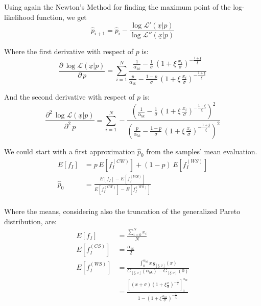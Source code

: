 Using again the Newton's Method for finding the maximum point of the log-likelihood function, we get
\begin{equation}
    \hat{p}_{i+1} = \hat{p}_i - \dfrac{\log \mathcal{L}'(\underline{x} | p )}{\log \mathcal{L}''(\underline{x} | p )}
\end{equation}

Where the first derivative with respect of $p$ is:
\begin{equation}
	\frac{\partial \, \log \mathcal{L}(\underline{x} | p )}{\partial \, p} =
	  \sum_{i=1}^N \frac{
	    \frac{1}{\alpha_{bk}} - \frac{1}{\sigma} \, \left( 1 + \xi \, \frac{x_i}{\sigma}\right)^{-\frac{1 + \xi}{\xi}}
	  }{
	    \frac{p}{\alpha_{bk}} - \frac{1 - p}{\sigma} \, \left( 1 + \xi \, \frac{x_i}{\sigma}\right)^{-\frac{1 + \xi}{\xi}}
	  } \label{eq:p_like_diff}
\end{equation}

And the second derivative with respect of $p$ is:
\begin{equation}
	\frac{\partial^2 \, \log \mathcal{L}(\underline{x} | p )}{\partial^2 \, p} =
	  \sum_{i=1}^N - \frac{
	    \left(\frac{1}{\alpha_{bk}} - \frac{1}{\sigma} \, \left( 1 + \xi \, \frac{x_i}{\sigma}\right)^{-\frac{1 + \xi}{\xi}}\right)^2
	  }{
	    \left(\frac{p}{\alpha_{bk}} - \frac{1 - p}{\sigma} \, \left( 1 + \xi \, \frac{x_i}{\sigma}\right)^{-\frac{1 + \xi}{\xi}}\right)^2
	  } \label{eq:p_like_diff_2}
\end{equation}

We could start with a first approximation $\hat{p}_0$ from the samples' mean evaluation.
\begin{align}
  E[f_I] &= p \, E[f_I^{(CW)}] + (1 - p) \,E[f_I^{(WS)}] \nonumber \\
	\hat{p}_0 &= \frac{E[f_I] - E[f_I^{(WS)}]}{E[f_I^{(CW)}] - E[f_I^{(WS)}]} \nonumber \\
\end{align}

Where the means, considering also the truncation of the generalized Pareto distribution, are:
\begin{align}
  E[f_I] &= \frac{\sum_{i = 0}^N x_i}{N} \nonumber \\
  E[f_I^{(CS)}] &= \frac{\alpha_{bk}}{2} \nonumber \\
  E[f_I^{(WS)}] &= \frac{\int_{0}^{\alpha_{bk}} x \, g_{[\xi, \sigma]}(x)}{G_{[\xi, \sigma]}(\alpha_{bk}) - G_{[\xi, \sigma]}(0)} \nonumber \\
    &= \frac{
      \left[ (x + \sigma)(1 + \xi \frac{x}{\sigma})^{- \frac{1}{\xi}} \right]_{0}^{\alpha_{bk}}
    }{
      1 - (1 + \xi \frac{\alpha_{bk}}{\sigma})^{- \frac{1}{\xi}}
    }
\end{align}


